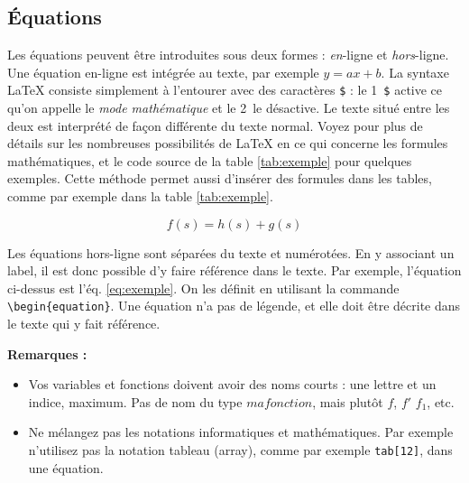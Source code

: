 \documentclass{ceri}
\begin{document}
\subsection{Équations}
\label{sec:equations}
Les équations peuvent être introduites sous deux formes : \textit{en}-ligne et \textit{hors}-ligne. Une équation en-ligne est intégrée au texte, par exemple $y=ax+b$. La syntaxe \LaTeX{} consiste simplement à l'entourer avec des caractères \texttt{\$} : le 1\ier~\texttt{\$} active ce qu'on appelle le \textit{mode mathématique} et le 2\ieme~le désactive. Le texte situé entre les deux est interprété de façon différente du texte normal. Voyez \cite{Wikibooks2010, Wikibooks2011} pour plus de détails sur les nombreuses possibilités de \LaTeX{} en ce qui concerne les formules mathématiques, et le code source de la table \ref{tab:exemple} pour quelques exemples. Cette méthode permet aussi d'insérer des formules dans les tables, comme par exemple dans la table \ref{tab:exemple}.

\begin{equation}
	f(s)=h(s)+g(s)
	\label{eq:exemple}
\end{equation}

Les équations hors-ligne sont séparées du texte et numérotées. En y associant un label, il est donc possible d'y faire référence dans le texte. Par exemple, l'équation ci-dessus est l'éq. \ref{eq:exemple}. On les définit en utilisant la commande \texttt{\textbackslash{}begin\{equation\}}. Une équation n'a pas de légende, et elle doit être décrite dans le texte qui y fait référence.

\textbf{Remarques :}
\begin{itemize}
	\item Vos variables et fonctions doivent avoir des noms courts : une lettre et un indice, maximum. Pas de nom du type ${mafonction}$, mais plutôt $f$, $f'$ $f_1$, etc\@.
	\item Ne mélangez pas les notations informatiques et mathématiques. Par exemple n'utilisez pas la notation tableau (array), comme par exemple \texttt{tab[12]}, dans une équation.
\end{itemize}
\end{document}
